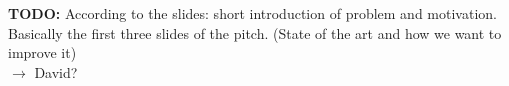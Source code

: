\textbf{TODO:} According to the slides: short introduction of problem and motivation. 
Basically the first three slides of the pitch. (State of the art and how we want to improve it)  \\
$\rightarrow$ David?
